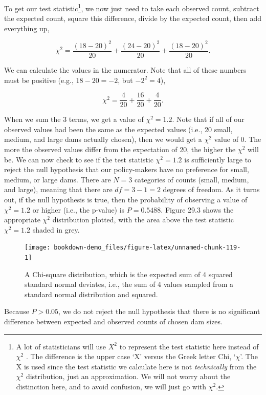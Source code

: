 \documentclass[
  openany]{krantz}
\begin{document}
To get our test statistic\footnote{A lot of statisticians will use \(X^{2}\) to represent the test statistic here instead of \(\chi^{2}\) \citep{Sokal1995}. The difference is the upper case `X' versus the Greek letter Chi, `\(\chi\)'. The X is used since the test statistic we calculate here is not \emph{technically} from the \(\chi^{2}\) distribution, just an approximation. We will not worry about the distinction here, and to avoid confusion, we will just go with \(\chi^{2}\).}, we now just need to take each observed count, subtract the expected count, square this difference, divide by the expected count, then add everything up,

\[\chi^{2} = \frac{(18 - 20)^{2}}{20} + \frac{(24 - 20)^{2}}{20} + \frac{(18 - 20)^{2}}{20}.\]

We can calculate the values in the numerator.
Note that all of these numbers must be positive (e.g., \(18 - 20 = -2\), but \(-2^{2} = 4\)),

\[\chi^{2} = \frac{4}{20} + \frac{16}{20} + \frac{4}{20}.\]

When we sum the 3 terms, we get a value of \(\chi^{2} = 1.2\).
Note that if all of our observed values had been the same as the expected values (i.e., 20 small, medium, and large dams actually chosen), then we would get a \(\chi^{2}\) value of 0.
The more the observed values differ from the expectation of 20, the higher the \(\chi^{2}\) will be.
We can now check to see if the test statistic \(\chi^{2} = 1.2\) is sufficiently large to reject the null hypothesis that our policy-makers have no preference for small, medium, or large dams.
There are \(N = 3\) categories of counts (small, medium, and large), meaning that there are \(df = 3 - 1 = 2\) degrees of freedom.
As it turns out, if the null hypothesis is true, then the probability of observing a value of \(\chi^{2} = 1.2\) or higher (i.e., the p-value) is \(P = 0.5488\).
Figure 29.3 shows the appropriate \(\chi^{2}\) distribution plotted, with the area above the test statistic \(\chi^{2} = 1.2\) shaded in grey.

\begin{figure}
\texttt{[image: bookdown-demo\_files/figure-latex/unnamed-chunk-119-1]} \caption{A Chi-square distribution, which is the expected sum of 4 squared standard normal deviates, i.e., the sum of 4 values sampled from a standard normal distribution and squared.}\label{fig:unnamed-chunk-119}
\end{figure}

Because \(P > 0.05\), we do not reject the null hypothesis that there is no significant difference between expected and observed counts of chosen dam sizes.
\end{document}

